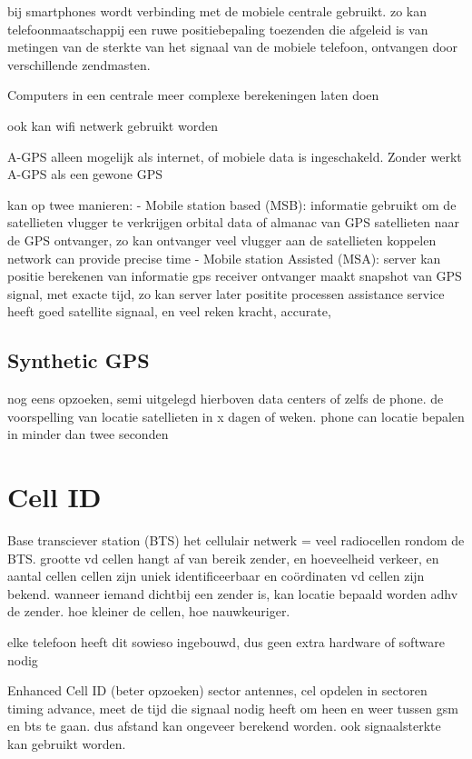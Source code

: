 bij smartphones wordt verbinding met de mobiele centrale gebruikt. zo kan telefoonmaatschappij een ruwe positiebepaling  toezenden die afgeleid is van metingen van de sterkte van het signaal van de mobiele telefoon, ontvangen door verschillende zendmasten. 

Computers in een centrale meer complexe berekeningen laten doen

ook kan wifi netwerk gebruikt worden 

A-GPS alleen mogelijk als internet, of mobiele data is ingeschakeld. Zonder werkt A-GPS als een gewone GPS


kan op twee manieren:
- Mobile station based (MSB): informatie gebruikt om de satellieten vlugger te verkrijgen
	orbital data of almanac van GPS satellieten naar de GPS ontvanger, zo kan ontvanger veel vlugger aan de satellieten koppelen
	network can provide precise time
- Mobile station Assisted (MSA): server kan positie berekenen van informatie gps receiver
	ontvanger maakt snapshot van GPS signal, met exacte tijd, zo kan server later positite processen
	assistance service heeft goed satellite signaal, en veel reken kracht, 
	accurate, 

\iffalse
english wikipedia heeft uitlegjes
\fi

\subsection{Synthetic GPS}
nog eens opzoeken, semi uitgelegd hierboven
data centers of zelfs de phone. de voorspelling van locatie satellieten in x dagen of weken.
phone can locatie bepalen in minder dan twee seconden


\section{Cell ID}
Base transciever station (BTS)
het cellulair netwerk = veel radiocellen rondom de BTS.
grootte vd cellen hangt af van bereik zender, en hoeveelheid verkeer, en aantal cellen
cellen zijn uniek identificeerbaar en coördinaten vd cellen zijn bekend.
wanneer iemand dichtbij een zender is, kan locatie bepaald worden adhv de zender.
hoe kleiner de cellen, hoe nauwkeuriger.

elke telefoon heeft dit sowieso ingebouwd, dus geen extra hardware of software nodig

Enhanced Cell ID (beter opzoeken)
sector antennes, cel opdelen in sectoren
timing advance, meet de tijd die signaal nodig heeft om heen en weer tussen gsm en bts te gaan. dus afstand kan ongeveer berekend worden. ook signaalsterkte kan gebruikt worden. 


